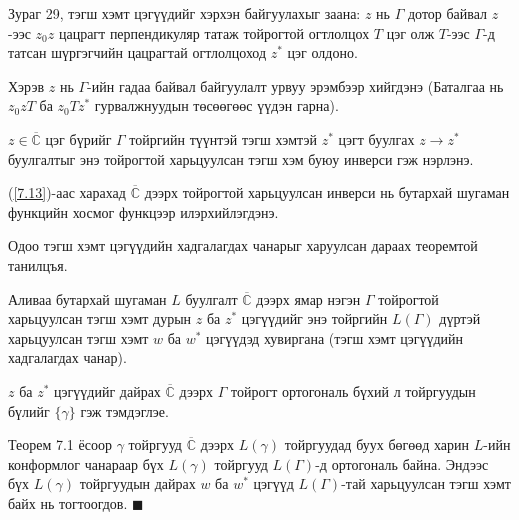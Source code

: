 Зураг 29, тэгш хэмт цэгүүдийг хэрхэн байгуулахыг заана: $z$ нь $\Gamma$ дотор байвал $z$-ээс $z_0z$ цацрагт перпендикуляр татаж тойрогтой огтлолцох $T$ цэг олж $T$-ээс $\Gamma$-д татсан шүргэгчийн цацрагтай огтлолцоход $z^*$ цэг олдоно.

Хэрэв $z$ нь $\Gamma$-ийн гадаа байвал байгуулалт урвуу эрэмбээр хийгдэнэ (Баталгаа нь $z_0zT$ ба $z_0Tz^*$ гурвалжнуудын төсөөгөөс үүдэн гарна).

$z\in \overline{\mathbb{C}}$ цэг бүрийг $\Gamma$ тойргийн түүнтэй тэгш хэмтэй $z^*$ цэгт буулгах $z\rightarrow z^*$ буулгалтыг энэ тойрогтой харьцуулсан тэгш хэм буюу инверси  гэж нэрлэнэ.

(\ref{7.13})-аас харахад $\overline{\mathbb{C}}$ дээрх тойрогтой харьцуулсан инверси нь бутархай шугаман функцийн хосмог функцээр илэрхийлэгдэнэ.

Одоо тэгш хэмт цэгүүдийн хадгалагдах чанарыг харуулсан дараах теоремтой танилцъя.

\begin{thm}
Аливаа бутархай шугаман $L$ буулгалт $\overline{\mathbb{C}}$ дээрх ямар нэгэн $\Gamma$ тойрогтой харьцуулсан тэгш хэмт дурын $z$ ба $z^*$ цэгүүдийг энэ тойргийн $L(\Gamma)$ дүртэй харьцуулсан тэгш хэмт $w$ ба $w^*$ цэгүүдэд хувиргана (тэгш хэмт цэгүүдийн хадгалагдах чанар).
\end{thm}
\begin{prf}
$z$ ба $z^*$ цэгүүдийг дайрах $\overline{\mathbb{C}}$ дээрх $\Gamma$ тойрогт ортогональ бүхий л тойргуудын бүлийг $\{\gamma\}$ гэж тэмдэглэе.

Теорем 7.1 ёсоор $\gamma$ тойргууд $\overline{\mathbb{C}}$ дээрх $L(\gamma)$ тойргуудад буух бөгөөд харин $L$-ийн конформлог чанараар бүх $L(\gamma)$ тойргууд $L(\Gamma)$-д ортогональ байна. Эндээс бүх $L(\gamma)$ тойргуудын дайрах $w$ ба $w^*$ цэгүүд $L(\Gamma)$-тай харьцуулсан тэгш хэмт байх нь тогтоогдов. 
\hfill $\blacksquare$\end{prf}
